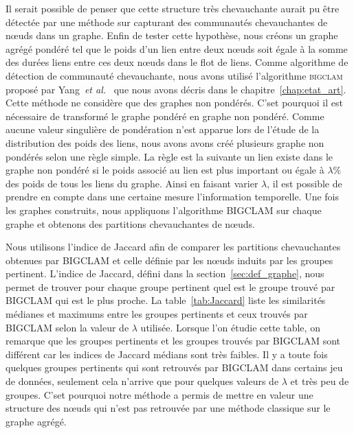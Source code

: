 \bigskip

Il serait possible de penser que cette structure très chevauchante aurait pu être détectée par une méthode sur capturant des communautés chevauchantes de n\oe uds dans un graphe.
Enfin de tester cette hypothèse, nous créons un graphe agrégé pondéré tel que le poids d'un lien entre deux n\oe uds soit égale à la somme des durées liens entre ces deux n\oe uds dans le flot de liens.
Comme algorithme de détection de communauté chevauchante, nous avons utilisé l'algorithme \textsc{bigclam} proposé par Yang~\emph{et al.}~\cite{Yang2013} que nous avons décris dans le chapitre~\ref{chap:etat_art}.
Cette méthode ne considère que des graphes non pondérés.
C'set pourquoi il est nécessaire de transformé le graphe pondéré en graphe non pondéré.
Comme aucune valeur singulière de pondération n'est apparue lors de l'étude de la distribution des poids des liens, nous avons avons créé plusieurs graphe non pondérés selon une règle simple.
La règle est la suivante un lien existe dans le graphe non pondéré si le poids associé au lien est plus important ou égale à $\lambda\%$ des poids de tous les liens du graphe.
Ainsi en faisant varier $\lambda$, il est possible de prendre en compte dans une certaine mesure l'information temporelle.
Une fois les graphes construits, nous appliquons l'algorithme \textsc{BIGCLAM} sur chaque graphe et obtenons des partitions chevauchantes de n\oe uds.

Nous utilisons l'indice de Jaccard afin de comparer les partitions chevauchantes obtenues par \textsc{BIGCLAM} et celle définie par les n\oe uds induits par les groupes pertinent.
L'indice de Jaccard, défini dans la section~\ref{sec:def_graphe}, nous permet de trouver pour chaque groupe pertinent quel est le groupe trouvé par \textsc{BIGCLAM} qui est le plus proche.
La table~\ref{tab:Jaccard} liste les similarités médianes et maximums entre les groupes pertinents et ceux trouvés par \textsc{BIGCLAM} selon la valeur de $\lambda$ utilisée.
Lorsque l'on étudie cette table, on remarque que les groupes pertinents et les groupes trouvés par \textsc{BIGCLAM} sont différent car les indices de Jaccard médians sont très faibles.
Il y a toute fois quelques groupes pertinents qui sont retrouvés par \textsc{BIGCLAM} dans certains jeu de données, seulement cela n'arrive que pour quelques valeurs de $\lambda$ et très peu de groupes.
C'set pourquoi notre méthode a permis de mettre en valeur une structure des n\oe uds qui n'est pas retrouvée par une méthode classique sur le graphe agrégé.

